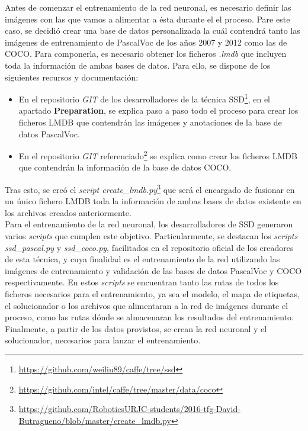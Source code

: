 \documentclass[a4paper, 12pt, spanish, chapterprefix, numbers=noenddot]{book}
\begin{document}
Antes de comenzar el entrenamiento de la red neuronal, es necesario definir las imágenes con las que vamos a alimentar a ésta durante el el proceso. Pare este caso, se decidió crear una base de datos personalizada la cuál contendrá tanto las imágenes de entrenamiento de PascalVoc de los años 2007 y 2012 como las de COCO. Para componerla, es necesario obtener los ficheros \textit{.lmdb} que incluyen toda la información de ambas bases de datos. Para ello, se dispone de los siguientes recursos y documentación:

\begin{itemize}
\item En el repositorio \textit{GIT} de los desarrolladores de la técnica SSD\footnote{\url{https://github.com/weiliu89/caffe/tree/ssd}}, en el apartado \textbf{Preparation}, se explica paso a paso todo el proceso para crear los ficheros LMDB que contendrán las imágenes y anotaciones de la base de datos PascalVoc.
\item En el repositorio \textit{GIT} referenciado\footnote{\url{https://github.com/intel/caffe/tree/master/data/coco}} se explica como crear los ficheros LMDB que contendrán la información de la base de datos COCO.
\end{itemize}

Tras esto, se creó el \textit{script create\_lmdb.py}\footnote{\url{https://github.com/RoboticsURJC-students/2016-tfg-David-Butragueno/blob/master/create_lmdb.py}} que será el encargado de fusionar en un único fichero LMDB toda la información de ambas bases de datos existente en los archivos creados anteriormente.\\

Para el entrenamiento de la red neuronal, los desarrolladores de SSD generaron varios \textit{scripts} que cumplen este objetivo. Particularmente, se destacan los \textit{scripts} \textit{ssd\_pascal.py} y \textit{ssd\_coco.py}, facilitados en el repositorio oficial de los creadores de esta técnica, y cuya finalidad es el entrenamiento de la red utilizando las imágenes de entrenamiento y validación de las bases de datos PascalVoc y COCO respectivamente. En estos \textit{scripts} se encuentran tanto las rutas de todos los ficheros necesarios para el entrenamiento, ya sea el modelo, el mapa de etiquetas, el solucionador o los archivos que alimentaran a la red de imágenes durante el proceso, como las rutas dónde se almacenaran los resultados del entrenamiento. Finalmente, a partir de los datos provistos, se crean la red neuronal y el solucionador, necesarios para lanzar el entrenamiento.\\
\end{document}

